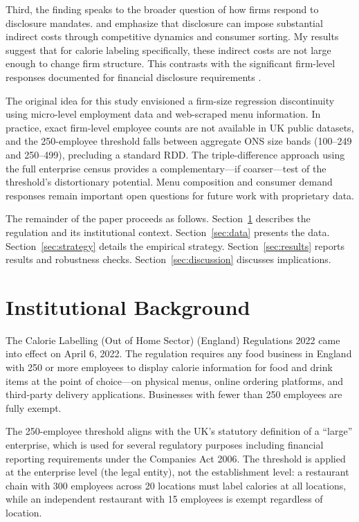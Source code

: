 \documentclass[12pt]{article}
\begin{document}
Third, the finding speaks to the broader question of how firms respond to disclosure mandates. \citet{jin2003economics} and \citet{dranove2003quality} emphasize that disclosure can impose substantial indirect costs through competitive dynamics and consumer sorting. My results suggest that for calorie labeling specifically, these indirect costs are not large enough to change firm structure. This contrasts with the significant firm-level responses documented for financial disclosure requirements \citep{leuz2008economic, christensen2016capital}.

The original idea for this study envisioned a firm-size regression discontinuity using micro-level employment data and web-scraped menu information. In practice, exact firm-level employee counts are not available in UK public datasets, and the 250-employee threshold falls between aggregate ONS size bands (100--249 and 250--499), precluding a standard RDD. The triple-difference approach using the full enterprise census provides a complementary---if coarser---test of the threshold's distortionary potential. Menu composition and consumer demand responses remain important open questions for future work with proprietary data.

The remainder of the paper proceeds as follows. Section~\ref{sec:background} describes the regulation and its institutional context. Section~\ref{sec:data} presents the data. Section~\ref{sec:strategy} details the empirical strategy. Section~\ref{sec:results} reports results and robustness checks. Section~\ref{sec:discussion} discusses implications.


\section{Institutional Background}
\label{sec:background}

The Calorie Labelling (Out of Home Sector) (England) Regulations 2022 came into effect on April 6, 2022. The regulation requires any food business in England with 250 or more employees to display calorie information for food and drink items at the point of choice---on physical menus, online ordering platforms, and third-party delivery applications. Businesses with fewer than 250 employees are fully exempt.

The 250-employee threshold aligns with the UK's statutory definition of a ``large'' enterprise, which is used for several regulatory purposes including financial reporting requirements under the Companies Act 2006. The threshold is applied at the enterprise level (the legal entity), not the establishment level: a restaurant chain with 300 employees across 20 locations must label calories at all locations, while an independent restaurant with 15 employees is exempt regardless of location.
\end{document}
